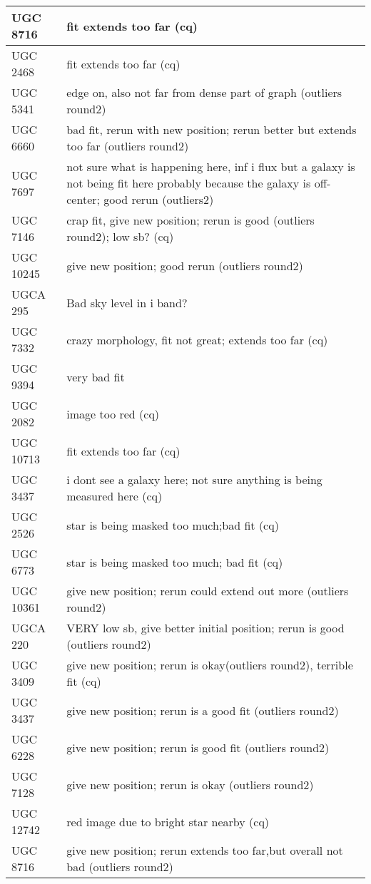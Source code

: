 \documentclass[10pt]{article}
\begin{document}
\begin{landscape}
\begin{longtable}{|l|l|}
UGC 8716 & fit extends too far (cq)\\ \hline
UGC 2468 & fit extends too far (cq)\\ \hline
UGC 5341 & edge on, also not far from dense part of graph (outliers round2)\\ \hline
UGC 6660 & bad fit, rerun with new position; rerun better but extends too far (outliers round2)\\ \hline
UGC 7697 & not sure what is happening here, inf i flux but a galaxy is not being fit here probably because the galaxy is off-center; good rerun (outliers2) \\ \hline
UGC 7146 & crap fit, give new position; rerun is good (outliers round2); low sb? (cq) \\ \hline 
UGC 10245 & give new position; good rerun (outliers round2)\\ \hline 
UGCA 295 & Bad sky level in i band?\\ \hline 
UGC 7332 & crazy morphology, fit not great; extends too far (cq)\\ \hline 
UGC 9394 & very bad fit \\ \hline 
UGC 2082 & image too red (cq)\\ \hline 
UGC 10713 & fit extends too far (cq)\\ \hline 
UGC 3437 & i dont see a galaxy here; not sure anything is being measured here (cq)\\ \hline 
UGC 2526 & star is being masked too much;bad fit (cq)\\ \hline 
UGC 6773 & star is being masked too much; bad fit (cq)\\ \hline 
UGC 10361 & give new position; rerun could extend out more (outliers round2)\\ \hline 
UGCA 220 & VERY low sb, give better initial position; rerun is good (outliers round2)\\ \hline 
UGC 3409 & give new position; rerun is okay(outliers round2), terrible fit (cq)\\ \hline 
UGC 3437 & give new position; rerun is a good fit (outliers round2)\\ \hline 
UGC 6228 & give new position; rerun is good fit (outliers round2)\\ \hline 
UGC 7128 & give new position; rerun is okay (outliers round2)\\ \hline 
UGC 12742 & red image due to bright star nearby (cq)\\ \hline
UGC 8716 & give new position; rerun extends too far,but overall not bad (outliers round2)\\ \hline

\end{longtable}
\end{landscape}
\end{document}
